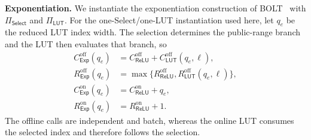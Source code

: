 \documentclass[journal]{IEEEtran}
\theoremstyle{definition}
\theoremstyle{plain}
\newcommand{\ReLU}{\mathsf{ReLU}}
\begin{document}
\textbf{Exponentiation.} We instantiate the exponentiation construction of
BOLT~\cite{Bolt} with $\Pi_{\mathsf{Select}}$ and $\Pi_{\mathsf{LUT}}$.
For the one-Select/one-LUT instantiation used here, let $q_e$ be the reduced
LUT index width. The selection determines the public-range branch and the LUT
then evaluates that branch, so
\begin{equation}
\begin{aligned}
C^{\mathrm{off}}_{\mathsf{Exp}}(q_e)
 &=C^{\mathrm{off}}_{\ReLU}+C^{\mathrm{off}}_{\mathsf{LUT}}(q_e,\ell),\\
R^{\mathrm{off}}_{\mathsf{Exp}}(q_e)
 &=\max\{R^{\mathrm{off}}_{\ReLU},R^{\mathrm{off}}_{\mathsf{LUT}}(q_e,\ell)\},\\
C^{\mathrm{on}}_{\mathsf{Exp}}(q_e)
 &=C^{\mathrm{on}}_{\ReLU}+q_e,\\
R^{\mathrm{on}}_{\mathsf{Exp}}(q_e)
 &=R^{\mathrm{on}}_{\ReLU}+1.
\end{aligned}
\label{eq:exp-cost}
\end{equation}
The offline calls are independent and batch, whereas the online LUT consumes
the selected index and therefore follows the selection.


\end{document}
